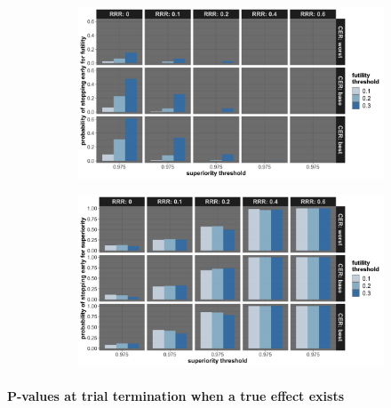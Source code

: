 \documentclass[]{article}
\let\oldparagraph\paragraph
\renewcommand{\paragraph}[1]{\oldparagraph{#1}\mbox{}}
\begin{document}
\begin{figure}
\centering
  \caption{Probability of stopping early due to futility, and stopping early due to superiority. Stopping probabilities
  are presented for the three control event rates (CER – rows), four relative risk reductions (RRR – columns), and three futility thresholds (legend).}
  \label{fig:fig}
  \begin{subfigure}{0.8\textwidth}
    \centering
    \caption{}
    \includegraphics{../p1_plots/batch_size_nb_1000/prob_stop_early_fut_p1.png}
  \end{subfigure}
  \begin{subfigure}{0.8\textwidth}
    \centering
    \caption{}
    \includegraphics{../p1_plots/batch_size_nb_1000/prob_stop_early_sup_p1.png}
  \end{subfigure}
\end{figure}

\hypertarget{p-values-at-trial-termination-when-a-true-effect-exists}{%
\paragraph{P-values at trial termination when a true effect
exists}\label{p-values-at-trial-termination-when-a-true-effect-exists}}
\end{document}
